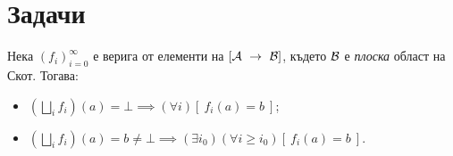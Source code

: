 \section{Задачи}

\begin{problem}
  \label{prob:sup-f}
  Нека $(f_i)^\infty_{i=0}$ е верига от елементи на $[\mathcal{A}~\to~\mathcal{B}]$,
  където $\mathcal{B}$ е {\em плоска} област на Скот. Тогава:
  \begin{itemize}
  \item 
    $(\bigsqcup_i f_i)(a) = \bot \implies (\forall i)[\ f_{i}(a) = b\ ]$;
  \item 
    $(\bigsqcup_i f_i)(a) = b \neq \bot \implies (\exists i_0)(\forall i\geq i_0)[\ f_{i}(a) = b\ ]$.
  \end{itemize}
\end{problem}
  


